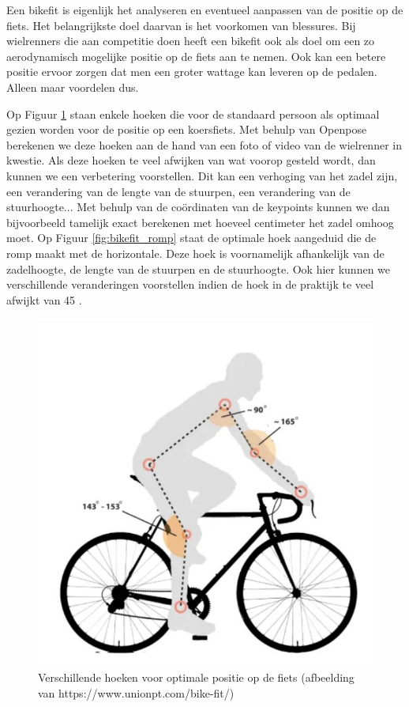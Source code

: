 \documentclass[a4paper,twoside,kulak]{kulakreport}
\begin{document}
Een bikefit is eigenlijk het analyseren en eventueel aanpassen van de positie op de fiets. Het belangrijkste doel daarvan is het voorkomen van blessures. Bij wielrenners die aan competitie doen heeft een bikefit ook als doel om een zo aerodynamisch mogelijke positie op de fiets aan te nemen. Ook kan een betere positie ervoor zorgen dat men een groter wattage kan leveren op de pedalen. Alleen maar voordelen dus.

Op Figuur \ref{fig:bikefit} staan enkele hoeken die voor de standaard persoon als optimaal gezien worden voor de positie op een koersfiets. Met behulp van Openpose berekenen we deze hoeken aan de hand van een foto of video van de wielrenner in kwestie. Als deze hoeken te veel afwijken van wat voorop gesteld wordt, dan kunnen we een verbetering voorstellen. Dit kan een verhoging van het zadel zijn, een verandering van de lengte van de stuurpen, een verandering van de stuurhoogte... Met behulp van de coördinaten van de keypoints kunnen we dan bijvoorbeeld tamelijk exact berekenen met hoeveel centimeter het zadel omhoog moet.
Op Figuur \ref{fig:bikefit_romp} staat de optimale hoek aangeduid die de romp maakt met de horizontale. Deze hoek is voornamelijk afhankelijk van de zadelhoogte, de lengte van de stuurpen en de stuurhoogte. Ook hier kunnen we verschillende veranderingen voorstellen indien de hoek in de praktijk te veel afwijkt van 45 \degree.

\begin{figure}[H]
	\centering
	\includegraphics[width=\textwidth]{bikefit}
	\caption{Verschillende hoeken voor optimale positie op de fiets (afbeelding van https://www.unionpt.com/bike-fit/)}
	\label{fig:bikefit}
\end{figure}
\end{document}
